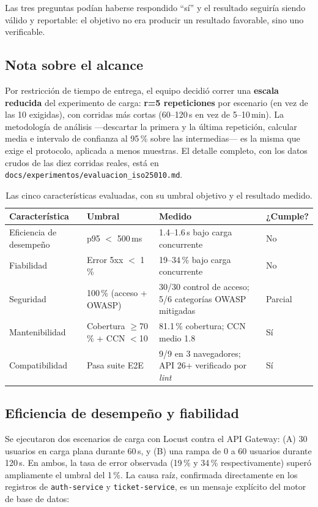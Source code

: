 Las tres preguntas podían haberse respondido \enquote{sí} y el resultado seguiría siendo válido y
reportable: el objetivo no era producir un resultado favorable, sino uno verificable.

\subsection{Nota sobre el alcance}

Por restricción de tiempo de entrega, el equipo decidió correr una \textbf{escala reducida} del
experimento de carga: \textbf{r=5 repeticiones} por escenario (en vez de las 10 exigidas), con
corridas más cortas (60--120\,s en vez de 5--10\,min). La metodología de análisis —descartar la
primera y la última repetición, calcular media e intervalo de confianza al 95\,\% sobre las
intermedias— es la misma que exige el protocolo, aplicada a menos muestras. El detalle completo,
con los datos crudos de las diez corridas reales, está en
\texttt{docs/experimentos/evaluacion\_iso25010.md}.

\begin{table}[H]
\centering
\small
\caption{Las cinco características evaluadas, con su umbral objetivo y el resultado medido.}
\label{tab:iso-umbrales}
\begin{tabular}{@{}p{2.9cm}p{3.1cm}p{4.6cm}p{1.3cm}@{}}
\toprule
\textbf{Característica} & \textbf{Umbral} & \textbf{Medido} & \textbf{¿Cumple?} \\
\midrule
Eficiencia de desempeño & p95 $<$ 500\,ms & 1.4--1.6\,s bajo carga concurrente & No \\
Fiabilidad & Error 5xx $<$ 1\,\% & 19--34\,\% bajo carga concurrente & No \\
Seguridad & 100\,\% (acceso + OWASP) & 30/30 control de acceso; 5/6 categorías OWASP mitigadas & Parcial \\
Mantenibilidad & Cobertura $\geq$70\,\% + CCN $<$10 & 81.1\,\% cobertura; CCN medio 1.8 & Sí \\
Compatibilidad & Pasa suite E2E & 9/9 en 3 navegadores; API 26+ verificado por \emph{lint} & Sí \\
\bottomrule
\end{tabular}
\end{table}

\subsection{Eficiencia de desempeño y fiabilidad}

Se ejecutaron dos escenarios de carga con Locust contra el API Gateway: (A) 30 usuarios en carga
plana durante 60\,s, y (B) una rampa de 0 a 60 usuarios durante 120\,s. En ambos, la tasa de
error observada (19\,\% y 34\,\% respectivamente) superó ampliamente el umbral del 1\,\%. La
causa raíz, confirmada directamente en los registros de \texttt{auth-service} y
\texttt{ticket-service}, es un mensaje explícito del motor de base de datos:

